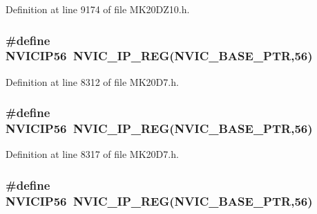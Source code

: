 Definition at line 9174 of file M\+K20\+D\+Z10.\+h.

\subsubsection[{\texorpdfstring{N\+V\+I\+C\+I\+P56}{NVICIP56}}]{\setlength{\rightskip}{0pt plus 5cm}\#define N\+V\+I\+C\+I\+P56~{\bf N\+V\+I\+C\+\_\+\+I\+P\+\_\+\+R\+EG}({\bf N\+V\+I\+C\+\_\+\+B\+A\+S\+E\+\_\+\+P\+TR},56)}\hypertarget{group___n_v_i_c___register___accessor___macros_ga12700f0d18486a40ae06c04c12dbef68}{}\label{group___n_v_i_c___register___accessor___macros_ga12700f0d18486a40ae06c04c12dbef68}


Definition at line 8312 of file M\+K20\+D7.\+h.

\subsubsection[{\texorpdfstring{N\+V\+I\+C\+I\+P56}{NVICIP56}}]{\setlength{\rightskip}{0pt plus 5cm}\#define N\+V\+I\+C\+I\+P56~{\bf N\+V\+I\+C\+\_\+\+I\+P\+\_\+\+R\+EG}({\bf N\+V\+I\+C\+\_\+\+B\+A\+S\+E\+\_\+\+P\+TR},56)}\hypertarget{group___n_v_i_c___register___accessor___macros_ga12700f0d18486a40ae06c04c12dbef68}{}\label{group___n_v_i_c___register___accessor___macros_ga12700f0d18486a40ae06c04c12dbef68}


Definition at line 8317 of file M\+K20\+D7.\+h.

\subsubsection[{\texorpdfstring{N\+V\+I\+C\+I\+P56}{NVICIP56}}]{\setlength{\rightskip}{0pt plus 5cm}\#define N\+V\+I\+C\+I\+P56~{\bf N\+V\+I\+C\+\_\+\+I\+P\+\_\+\+R\+EG}({\bf N\+V\+I\+C\+\_\+\+B\+A\+S\+E\+\_\+\+P\+TR},56)}\hypertarget{group___n_v_i_c___register___accessor___macros_ga12700f0d18486a40ae06c04c12dbef68}{}\label{group___n_v_i_c___register___accessor___macros_ga12700f0d18486a40ae06c04c12dbef68}


